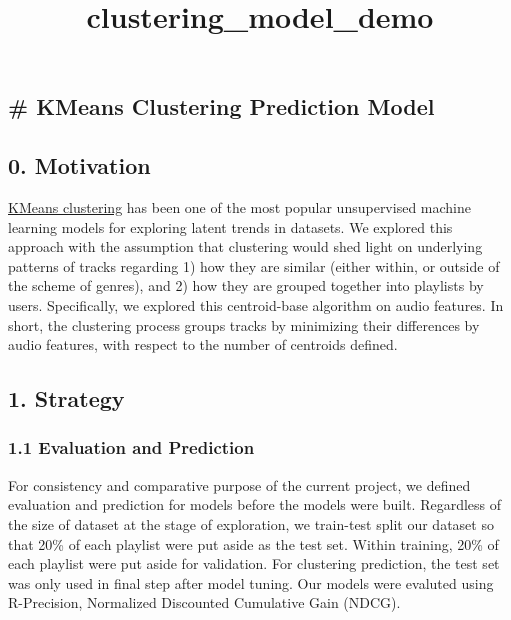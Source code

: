 \documentclass[11pt]{article}
\title{clustering\_model\_demo}
\begin{document}
    
    
    \maketitle
    
    

    
    \subsection{\# KMeans Clustering Prediction
Model}\label{kmeans-clustering-prediction-model}

    \subsection{0. Motivation}\label{motivation}

    \href{https://towardsdatascience.com/understanding-k-means-clustering-in-machine-learning-6a6e67336aa1}{KMeans
clustering} has been one of the most popular unsupervised machine
learning models for exploring latent trends in datasets. We explored
this approach with the assumption that clustering would shed light on
underlying patterns of tracks regarding 1) how they are similar (either
within, or outside of the scheme of genres), and 2) how they are grouped
together into playlists by users. Specifically, we explored this
centroid-base algorithm on audio features. In short, the clustering
process groups tracks by minimizing their differences by audio features,
with respect to the number of centroids defined.

    \subsection{1. Strategy}\label{strategy}

    \subsubsection{1.1 Evaluation and
Prediction}\label{evaluation-and-prediction}

    For consistency and comparative purpose of the current project, we
defined evaluation and prediction for models before the models were
built. Regardless of the size of dataset at the stage of exploration, we
train-test split our dataset so that 20\% of each playlist were put
aside as the test set. Within training, 20\% of each playlist were put
aside for validation. For clustering prediction, the test set was only
used in final step after model tuning. Our models were evaluted using
R-Precision, Normalized Discounted Cumulative Gain (NDCG).
\end{document}
